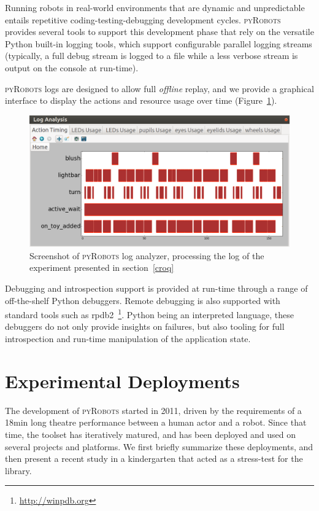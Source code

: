 \documentclass[letterpaper, 10pt, conference]{ieeeconf}      %
\newcommand{\pyRobots}{\textsc{pyRobots}}
\begin{document}
Running robots in real-world  environments that are dynamic and unpredictable
entails repetitive coding-testing-debugging development cycles. \pyRobots{}
provides several tools to support this development phase that rely on the
versatile Python built-in logging tools, which support configurable parallel
logging streams (typically, a full debug stream is logged to a file while a less
verbose stream is output on the console at run-time).

\pyRobots{} logs are designed to allow full \emph{offline} replay, and we
provide a graphical interface to display the actions and resource usage over
time (Figure~\ref{log_view}).

\begin{figure}
        \centering
        \includegraphics[width=0.9\columnwidth]{log}
        \caption{Screenshot of \pyRobots{} log analyzer, processing the log of the
        experiment presented in section~\ref{croq}}
        \label{log_view}
\end{figure}

Debugging and introspection support is provided at run-time through a range of
off-the-shelf Python debuggers. Remote debugging is also supported with standard
tools such as {\sc rpdb2}~\footnote{\url{http://winpdb.org}}. Python being an
interpreted language, these debuggers do not only provide insights on failures,
but also tooling for full introspection and run-time manipulation of the
application state.


\section{Experimental Deployments}

The development of \pyRobots{} started in 2011, driven by the requirements of a
18min long theatre performance between a human actor and a robot. Since that
time, the toolset has iteratively matured, and has been deployed and used on
several projects and platforms. We first briefly summarize these deployments,
and then present a recent study in a kindergarten that acted as a stress-test
for the library.
\end{document}
